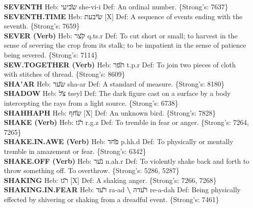 {\textbf{SEVENTH} Heb: {\large\H שביעי} she-vi-i Def: An ordinal number. \{Strong's: 7637\}\hfill{}\\

\textbf{SEVENTH.TIME} Heb: {\large\H שיבעת} {[}X{]} Def: A sequence of events ending with the seventh. \{Strong's: 7659\}\hfill{}\\

\textbf{SEVER (Verb)} Heb: {\large\H קצר} q.ts.r Def: To cut short or small; to harvest in the sense of severing the crop from its stalk; to be impatient in the sense of patience being severed. \{Strong's: 7114\}\hfill{}\\

\textbf{SEW.TOGETHER (Verb)} Heb: {\large\H תפר} t.p.r Def: To join two pieces of cloth with stitches of thread. \{Strong's: 8609\}\hfill{}\\

\textbf{SHA'AR} Heb: {\large\H שער} sha-ar Def: A standard of measure. \{Strong's: 8180\}\hfill{}\\

\textbf{SHADOW} Heb: {\large\H צל} tseyl Def: The dark figure cast on a surface by a body intercepting the rays from a light source. \{Strong's: 6738\}\hfill{}\\

\textbf{SHAHHAPH} Heb: {\large\H שחף} {[}X{]} Def: An unknown bird. \{Strong's: 7828\}\hfill{}\\

\textbf{SHAKE (Verb)} Heb: {\large\H רגז} r.g.z Def: To tremble in fear or anger. \{Strong's: 7264, 7265\}\hfill{}\\

\textbf{SHAKE.IN.AWE (Verb)} Heb: {\large\H פחד} p.hh.d Def: To physically or mentally tremble in amazement or fear. \{Strong's: 6342\}\hfill{}\\

\textbf{SHAKE.OFF (Verb)} Heb: {\large\H נער} n.ah.r Def: To violently shake back and forth to throw something off. To overthrow. \{Strong's: 5286, 5287\}\hfill{}\\

\textbf{SHAKING} Heb: {\large\H רגז} {[}X{]} Def: A shaking anger. \{Strong's: 7266, 7268\}\hfill{}\\

\textbf{SHAKING.IN.FEAR} Heb: {\large\H רעד} ra-ad \textbf{\textbackslash{}} {\large\H רעדה} re-a-dah Def: Being physically effected by shivering or shaking from a dreadful event. \{Strong's: 7461\}\hfill{}\\

}

